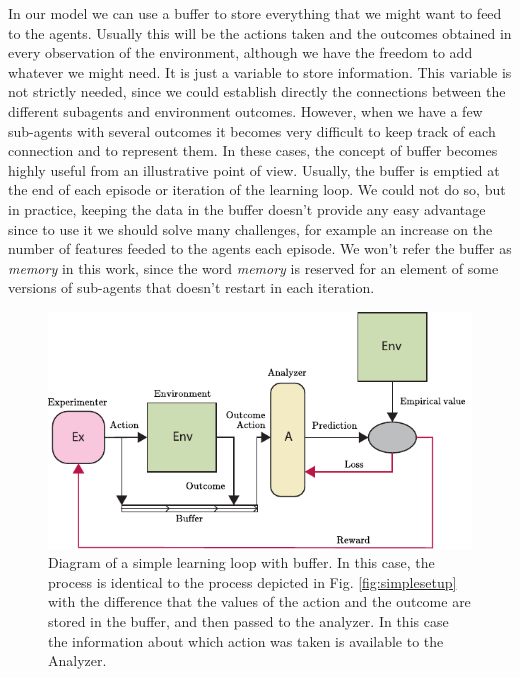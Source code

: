 \documentclass[11pt,a4paper,twoside]{report}
\newcommand{\+}{\textnormal{+} }
\theoremstyle{definition}
\numberwithin{equation}{chapter}
\begin{document}
In our model we can use a buffer to store everything that we might want to feed
to the agents. Usually this will be the actions taken and the outcomes obtained
in every observation of the environment, although we have the freedom to add
whatever we might need. It is just a variable to store information.
This variable is not strictly needed, since we could establish directly the 
connections between the different subagents and environment outcomes. However,
when we have a few sub-agents with several outcomes it becomes very difficult
to keep track of each connection and to represent them. In these cases, the 
concept of buffer becomes highly useful from an illustrative point of view. 
Usually, the buffer is emptied at the end of each episode or iteration of the 
learning loop. We could not do so, but in practice, 
keeping the data in the buffer doesn't provide any easy advantage since to use 
it we should solve many challenges, for example an increase on the number of 
features feeded to the agents each episode. We won't refer the buffer as 
\textit{memory} in this work, since the word \textit{memory} is reserved for an 
element of some versions of sub-agents that doesn't restart in 
each iteration. 


\begin{figure}
  \centering
  \includegraphics{figures/SimpleSetUp(Buffer).pdf}
  \caption{Diagram of a simple learning loop with buffer. In this case, the process
  is identical to the process depicted in Fig. \ref{fig:simplesetup} with
  the difference that the values of the action and the outcome are stored in 
  the buffer, and then passed to the analyzer. In this case the information
  about which action was taken is available to the Analyzer.} 
  \label{fig:simplesetupbuffer}
\end{figure}
\end{document}
